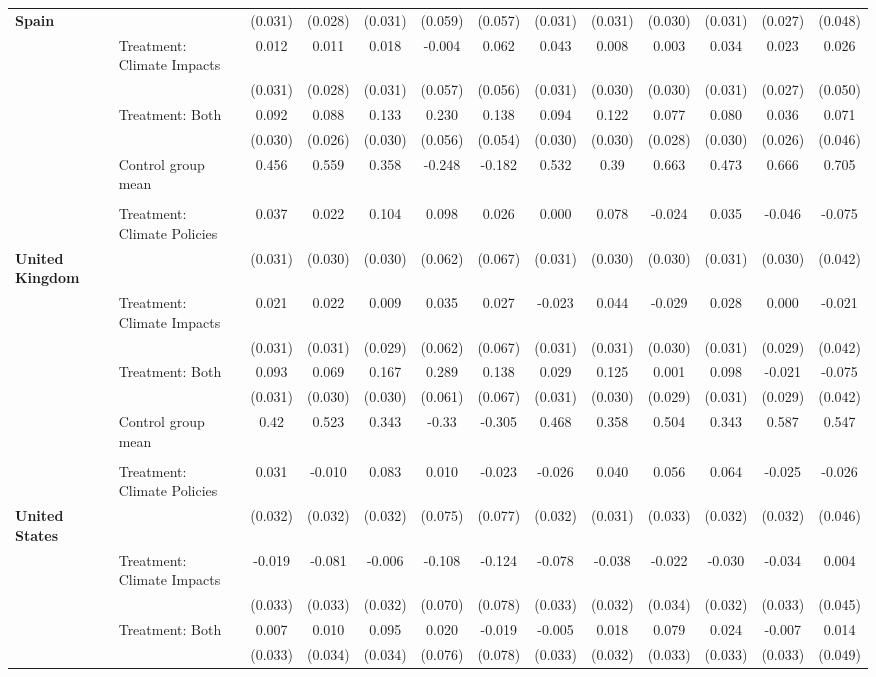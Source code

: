 \begin{tabular}[t]{llccccccccccc}
\textbf{Spain} &  & (0.031) & (0.028) & (0.031) & (0.059) & (0.057) & (0.031) & (0.031) & (0.030) & (0.031) & (0.027) & (0.048)\\
 & Treatment: Climate Impacts & 0.012 & 0.011 & 0.018 & -0.004 & 0.062 & 0.043 & 0.008 & 0.003 & 0.034 & 0.023 & 0.026\\
 &  & (0.031) & (0.028) & (0.031) & (0.057) & (0.056) & (0.031) & (0.030) & (0.030) & (0.031) & (0.027) & (0.050)\\
 & Treatment: Both & 0.092 & 0.088 & 0.133 & 0.230 & 0.138 & 0.094 & 0.122 & 0.077 & 0.080 & 0.036 & 0.071\\
 &  & (0.030) & (0.026) & (0.030) & (0.056) & (0.054) & (0.030) & (0.030) & (0.028) & (0.030) & (0.026) & (0.046)\\
\midrule
 & Control group mean & 0.456 & 0.559 & 0.358 & -0.248 & -0.182 & 0.532 & 0.39 & 0.663 & 0.473 & 0.666 & 0.705\\
 &  &  &  &  &  &  &  &  &  &  &  & \\
 & Treatment: Climate Policies & 0.037 & 0.022 & 0.104 & 0.098 & 0.026 & 0.000 & 0.078 & -0.024 & 0.035 & -0.046 & -0.075\\
\textbf{United Kingdom} &  & (0.031) & (0.030) & (0.030) & (0.062) & (0.067) & (0.031) & (0.030) & (0.030) & (0.031) & (0.030) & (0.042)\\
 & Treatment: Climate Impacts & 0.021 & 0.022 & 0.009 & 0.035 & 0.027 & -0.023 & 0.044 & -0.029 & 0.028 & 0.000 & -0.021\\
 &  & (0.031) & (0.031) & (0.029) & (0.062) & (0.067) & (0.031) & (0.031) & (0.030) & (0.031) & (0.029) & (0.042)\\
 & Treatment: Both & 0.093 & 0.069 & 0.167 & 0.289 & 0.138 & 0.029 & 0.125 & 0.001 & 0.098 & -0.021 & -0.075\\
 &  & (0.031) & (0.030) & (0.030) & (0.061) & (0.067) & (0.031) & (0.030) & (0.029) & (0.031) & (0.029) & (0.042)\\
\midrule
 & Control group mean & 0.42 & 0.523 & 0.343 & -0.33 & -0.305 & 0.468 & 0.358 & 0.504 & 0.343 & 0.587 & 0.547\\
 &  &  &  &  &  &  &  &  &  &  &  & \\
 & Treatment: Climate Policies & 0.031 & -0.010 & 0.083 & 0.010 & -0.023 & -0.026 & 0.040 & 0.056 & 0.064 & -0.025 & -0.026\\
\textbf{United States} &  & (0.032) & (0.032) & (0.032) & (0.075) & (0.077) & (0.032) & (0.031) & (0.033) & (0.032) & (0.032) & (0.046)\\
 & Treatment: Climate Impacts & -0.019 & -0.081 & -0.006 & -0.108 & -0.124 & -0.078 & -0.038 & -0.022 & -0.030 & -0.034 & 0.004\\
 &  & (0.033) & (0.033) & (0.032) & (0.070) & (0.078) & (0.033) & (0.032) & (0.034) & (0.032) & (0.033) & (0.045)\\
 & Treatment: Both & 0.007 & 0.010 & 0.095 & 0.020 & -0.019 & -0.005 & 0.018 & 0.079 & 0.024 & -0.007 & 0.014\\
 &  & (0.033) & (0.034) & (0.034) & (0.076) & (0.078) & (0.033) & (0.032) & (0.033) & (0.033) & (0.033) & (0.049)\\
\bottomrule
\bottomrule
\end{tabular}